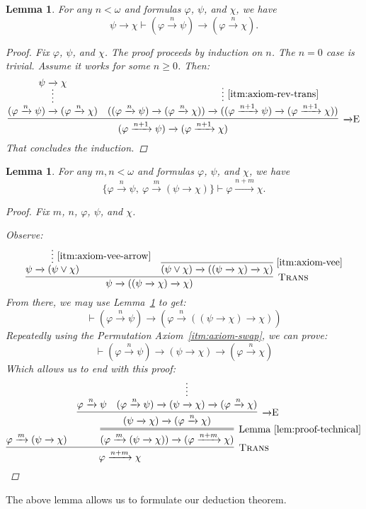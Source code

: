 \documentclass{amsart}
\newtheorem{lemma}[theorem]{Lemma}
\theoremstyle{definition}
\numberwithin{equation}{theorem}
\renewcommand{\phi}{\varphi}
\newcommand{\proves}{\vdash}
\newcommand{\narrow}[1]{\xrightarrow{#1}}
\renewcommand{\to}{\narrow{}}
\newcommand{\arr}{{\to}}
\newcommand{\elim}{\!\operatorname{E}}
\newcommand{\trans}{\text{\sc{Trans}}}
\newcommand{\aref}[1]{\!\text{\ref{itm:axiom-#1}}}
\begin{document}
\begin{lemma}\label{lem:proof-technical}
  For any $n<\omega$ and formulas $\phi$, $\psi$, and $\chi$, we have
  \[
    \psi\to\chi\proves (\phi\narrow{n}\psi)\to(\phi\narrow{n}\chi).
  \]
  \begin{proof}
    Fix $\phi$, $\psi$, and $\chi$.
    The proof proceeds by induction on $n$.
    The $n=0$ case is trivial.
    Assume it works for some $n\geq 0$.
    Then:
    \[
      \infer[\arr\elim]{(\phi\narrow{n+1}\psi)\to(\phi\narrow{n+1}\chi)}{
        \infer*{(\phi\narrow{n}\psi)\to(\phi\narrow{n}\chi)}{\psi\to\chi} &
        \infer*[\aref{rev-trans}]{((\phi\narrow{n}\psi)\to(\phi\narrow{n}\chi))\to((\phi\narrow{n+1}\psi)\to(\phi\narrow{n+1}\chi))}{}
      }
    \]
    That concludes the induction.
  \end{proof}
\end{lemma}
\begin{lemma}\label{lem:no-contraction}
  For any $m,n<\omega$ and formulas $\phi$, $\psi$, and $\chi$, we have
  \[
    \{\phi\narrow{n}\psi,\ \phi\narrow{m}(\psi\to\chi)\}\proves\phi\narrow{n+m}\chi.
  \]
  \begin{proof}  
  Fix $m$, $n$, $\phi$, $\psi$, and $\chi$.
  
  Observe:
  \[
    \infer[\trans]{\psi\to((\psi\to\chi)\to\chi)}{
      \infer*[\aref{vee-arrow}]{\psi\to(\psi\vee\chi)}{} &
      \infer[\aref{vee}]{(\psi\vee\chi)\to((\psi\to\chi)\to\chi)}{}
    }
  \]
  From there, we may use Lemma~\ref{lem:proof-technical} to get:
  \[
    \proves (\phi\narrow{n}\psi)\to(\phi\narrow{n}((\psi\to\chi)\to\chi))
  \]
  Repeatedly using the Permutation Axiom~\ref{itm:axiom-swap}, we can prove:
  \[
    \proves (\phi\narrow{n}\psi)\to(\psi\to\chi)\to(\phi\narrow{n}\chi)
  \]
  Which allows us to end with this proof:
  \[
    \infer[\trans]{\phi\narrow{n+m}\chi}{
      \phi\narrow{m}(\psi\to\chi) &
      \infer=[\text{Lemma~\ref{lem:proof-technical}}]{(\phi\narrow{m}(\psi\to\chi))\to(\phi\narrow{n+m}\chi)}{
	      \infer[\arr\elim]{(\psi\to\chi)\to(\phi\narrow{n}\chi)}{
	        \phi\narrow{n}\psi &
	        \infer*{(\phi\narrow{n}\psi)\to(\psi\to\chi)\to(\phi\narrow{n}\chi)}{}
	      }
	    }
    }\qedhere
  \]
  \end{proof}
\end{lemma}
The above lemma allows us to formulate our deduction theorem.
\end{document}
